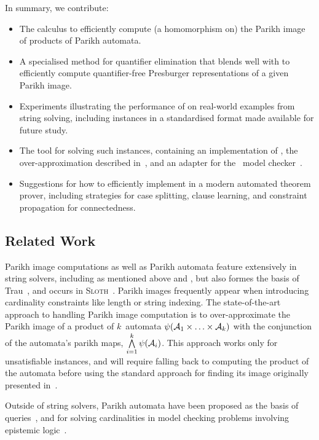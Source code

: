 \documentclass[acmsmall,review,anonymous,screen]{acmart}\settopmatter{printfolios=true,printccs=false,printacmref=true}
\theoremstyle{definition}
\begin{document}
In summary, we contribute:
\begin{itemize}
\item The \Calculus{} calculus to efficiently compute (a homomorphism on) the
Parikh image of products of Parikh automata.
\item A specialised method for quantifier elimination that blends well with \Calculus{} to efficiently compute quantifier-free Presburger representations of a given Parikh image. 
\item Experiments illustrating the performance of \Calculus{} on real-world examples from string solving, including \NrBenchmarks{} instances in a standardised format made available for future study.
\item The \Catra{} tool for solving such instances, containing an implementation of \Calculus{}, the over-approximation described in~\cite{approximate-parikh}, and an adapter for the~\Nuxmv{} model checker~\cite{nuxmv}.
\item Suggestions for how to efficiently implement \Calculus{} in a modern automated theorem prover, including strategies for case splitting, clause learning, and constraint propagation for connectedness.
\end{itemize}

\subsection{Related Work}

Parikh image computations as well as Parikh automata \cite{parikh-automata}
feature extensively in string solvers, including as mentioned above \Ostrich{}
and \OstrichPlus{} \cite{ostrich,ostrich-plus}, but also formes the basis of
Trau~\cite{trau-pldi}, and occurs in \textsc{Sloth}~\cite{sloth}. Parikh images
frequently appear when introducing cardinality constraints like length or string
indexing. The state-of-the-art approach to handling Parikh image computation is
to over-approximate the Parikh image of a product of $k$~automata
$\operatorname{\psi}(\mathcal{A}_1 \times \ldots \times \mathcal{A}_k)$ with the
conjunction of the automata's parikh maps, $\bigwedge\limits_{i=1} ^{k}
\operatorname{\psi}(\mathcal{A}_i)$. This approach works only for unsatisfiable instances,
and will require falling back to computing the product of the automata before
using the standard approach for finding its image originally presented in~\cite{generate-parikh-image}.

Outside of string solvers, Parikh automata have been proposed as the basis of
queries~\cite{graph-queries}, and for solving cardinalities in model checking
problems involving epistemic logic~\cite{epistemic-logic}.
\end{document}
